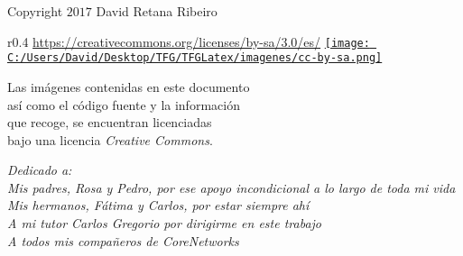 \documentclass[10pt, a4paper, twoside]{report} %
\begin{document}





\newpage
\thispagestyle{empty} %
\null\vfill


\newpage
\thispagestyle{empty} %
\null\vfill


\textcopyright \hspace{0.3cm} Copyright $2017$ David Retana Ribeiro\\

\begin{wrapfigure}{r}{0.4\textwidth}
  \centering \url{https://creativecommons.org/licenses/by-sa/3.0/es/}
  \href{https://creativecommons.org/licenses/by-sa/3.0/es/}
       {\texttt{[image: C:/Users/David/Desktop/TFG/TFGLatex/imagenes/cc-by-sa.png]}}
\end{wrapfigure}
\noindent Las imágenes contenidas en este documento \\
así como el código fuente y la información \\
que recoge, se encuentran licenciadas \\
bajo una licencia \textit{Creative Commons}.

\clearpage

\thispagestyle{empty}
\begin{flushright}
  \textit{Dedicado a: \\
  Mis padres, Rosa y Pedro, por ese apoyo incondicional a lo largo de toda mi vida \\
  Mis hermanos, Fátima y Carlos, por estar siempre ahí\\
  A mi tutor Carlos Gregorio por dirigirme en este trabajo\\
  A todos mis compañeros de CoreNetworks}
\end{flushright}
\end{document}
